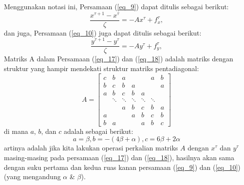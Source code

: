 Menggunakan notasi ini, Persamaan (\ref{eq_9}) dapat ditulis sebagai berikut:
\begin{equation}
\label{eq_17}
\dfrac{ x^{\tau+1} - x^\tau }{\zeta} = -Ax^\tau + f^\tau_x ,
\end{equation}
dan juga, Persamaan (\ref{eq_10}) juga dapat ditulis sebagai berikut:
\begin{equation}
\label{eq_18}
\dfrac{ y^{\tau+1} - y^\tau }{\zeta} = -Ay^\tau + f^\tau_y ,
\end{equation}
Matriks A dalam Persamaan (\ref{eq_17}) dan (\ref{eq_18}) adalah matriks dengan struktur yang hampir mendekati struktur matriks pentadiagonal\citep{acton2007biomedical:19}:
\begin{equation}
\label{eq_19}
A=
	\begin{bmatrix}
	c 	& b			& a 	 & 		  & 	   & a 		& b \\
	b 	& c     	& b 	 & 	a	  & 	   &  		& a \\
	a 	& b     	& c 	 & 	b	  & a	   &  		&  	\\
	& \ddots 	& \ddots & \ddots & \ddots & \ddots &  	\\
	&  			& a 	 & 	b	  & c	   & b 		& a \\
	a 	&  			& 	 	 & 	a	  & b	   & c 		& b \\
	b 	& a 		&  		 & 		  & a	   & b 		& c
	\end{bmatrix}
\end{equation}
di mana $a$, $b$, dan $c$ adalah sebagai berikut:
\begin{equation}
\label{eq_20}
a = \beta, b = -(4\beta+\alpha), c=6\beta+2\alpha
\end{equation}
artinya adalah jika kita lakukan operasi perkalian matriks $A$ dengan $x^\tau$ dan $y^\tau$ masing-masing pada persamaan (\ref{eq_17}) dan (\ref{eq_18}), hasilnya akan sama dengan suku pertama dan kedua ruas kanan persamaan (\ref{eq_9}) dan (\ref{eq_10}) (yang mengandung $\alpha$ \& $\beta$).

